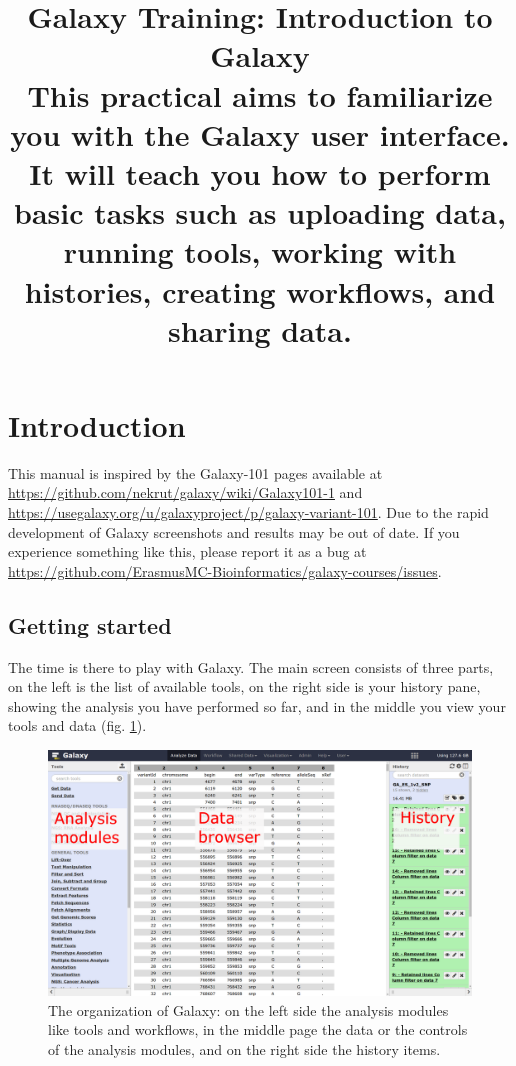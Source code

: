 \documentclass[11pt,a4paper]{article}
\begin{document}
\title{ \textit{\institute}\text{ }Galaxy Training: Introduction to Galaxy \\
{ \large This practical aims to familiarize you with the Galaxy user interface. It will teach you how to perform basic tasks such as uploading data, running tools, working with histories, creating workflows, and sharing data. } }

\author{ \authors }
\maketitle



\section*{Introduction}
This manual is inspired by the Galaxy-101 pages available at \url{https://github.com/nekrut/galaxy/wiki/Galaxy101-1} and \url{https://usegalaxy.org/u/galaxyproject/p/galaxy-variant-101}.
Due to the rapid development of Galaxy screenshots and results may be out of date. If you experience something like this, please report it as a bug at \url{https://github.com/ErasmusMC-Bioinformatics/galaxy-courses/issues}.


\subsection*{Getting started}
The time is there to play with Galaxy. The main screen consists of three parts, on the left is the list of available tools, on the right side
is your history pane, showing the analysis you have performed so far, and in the middle you view your tools and data (fig. \ref{fig:organization_layout}).

\begin{figure}
 \center
  \includegraphics[width=\textwidth]{figures/galaxy_layout}
  \caption{\small{ The organization of Galaxy: on the left side the analysis modules like tools and workflows, in the middle page the data or the controls of the analysis modules, and on the right side the history items. }}
  \label{fig:organization_layout}
\end{figure}
\end{document}
